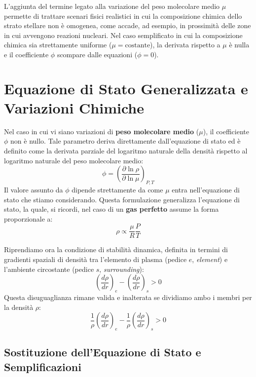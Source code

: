 L'aggiunta del termine legato alla variazione del peso molecolare medio $\mu$ permette di trattare scenari fisici realistici in cui la composizione chimica dello strato stellare non è omogenea, come accade, ad esempio, in prossimità delle zone in cui avvengono reazioni nucleari. Nel caso semplificato in cui la composizione chimica sia strettamente uniforme ($\mu = \text{costante}$), la derivata rispetto a $\mu$ è nulla e il coefficiente $\phi$ scompare dalle equazioni ($\phi = 0$).

\section{Equazione di Stato Generalizzata e Variazioni Chimiche}

Nel caso in cui vi siano variazioni di \textbf{peso molecolare medio} ($\mu$), il coefficiente $\phi$ non è nullo. Tale parametro deriva direttamente dall'equazione di stato ed è definito come la derivata parziale del logaritmo naturale della densità rispetto al logaritmo naturale del peso molecolare medio:
\begin{equation}
\phi = \left( \frac{\partial \ln \rho}{\partial \ln \mu} \right)_{P,T}
\end{equation}
Il valore assunto da $\phi$ dipende strettamente da come $\mu$ entra nell'equazione di stato che stiamo considerando. Questa formulazione generalizza l'equazione di stato, la quale, si ricordi, nel caso di un \textbf{gas perfetto} assume la forma proporzionale a:
\begin{equation}
\rho \propto \frac{\mu}{R} \frac{P}{T}
\end{equation}

Riprendiamo ora la condizione di stabilità dinamica, definita in termini di gradienti spaziali di densità tra l'elemento di plasma (pedice $e$, \textit{element}) e l'ambiente circostante (pedice $s$, \textit{surrounding}):
\begin{equation}
\left( \frac{d\rho}{dr} \right)_e - \left( \frac{d\rho}{dr} \right)_s > 0
\end{equation}
Questa disuguaglianza rimane valida e inalterata se dividiamo ambo i membri per la densità $\rho$:
\begin{equation}
\frac{1}{\rho} \left( \frac{d\rho}{dr} \right)_e - \frac{1}{\rho} \left( \frac{d\rho}{dr} \right)_s > 0
\end{equation}

\subsection{Sostituzione dell'Equazione di Stato e Semplificazioni}

